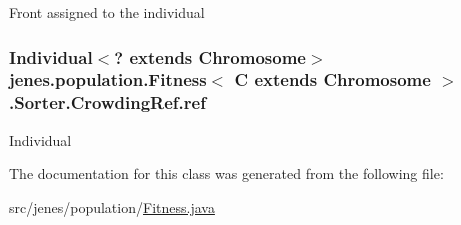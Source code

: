 Front assigned to the individual \hypertarget{classjenes_1_1population_1_1_fitness_3_01_c_01extends_01_chromosome_01_4_1_1_sorter_1_1_crowding_ref_af8a2da66d7ba48d280c26d5c38b9ef14}{
\subsubsection[{ref}]{\setlength{\rightskip}{0pt plus 5cm}Individual$<$? extends Chromosome$>$ jenes.\-population.\-Fitness$<$ C extends Chromosome $>$.Sorter.\-Crowding\-Ref.\-ref\hspace{0.3cm}{\ttfamily [private]}}}\label{classjenes_1_1population_1_1_fitness_3_01_c_01extends_01_chromosome_01_4_1_1_sorter_1_1_crowding_ref_af8a2da66d7ba48d280c26d5c38b9ef14}
Individual 

The documentation for this class was generated from the following file\-:\begin{DoxyCompactItemize}
\item 
src/jenes/population/\hyperlink{_fitness_8java}{Fitness.\-java}\end{DoxyCompactItemize}
